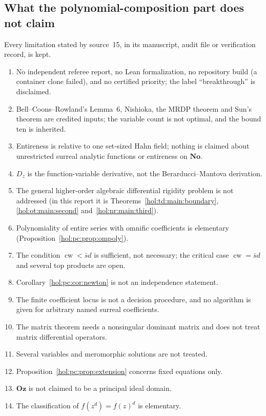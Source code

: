 \documentclass[11pt]{article}
\numberwithin{equation}{section}
\theoremstyle{definition}
\theoremstyle{remark}
\newcommand{\No}{\mathbf{No}}
\newcommand{\Oz}{\mathbf{Oz}}
\begin{document}
\subsection{What the polynomial-composition part does not claim}
\label{hol:pc:sub:nonclaims}

Every limitation stated by source~15, in its manuscript, audit file or
verification record, is kept.
\begin{enumerate}[label=\textup{(P\arabic*)}]
\item No independent referee report, no Lean formalization, no repository
build (a container clone failed), and no certified priority; the label
``breakthrough'' is disclaimed.
\item Bell--Coons--Rowland's Lemma~6, Nishioka, the MRDP theorem and Sun's
theorem are credited inputs; the variable count is not optimal, and the bound
ten is inherited.
\item Entireness is relative to one set-sized Hahn field; nothing is claimed
about unrestricted surreal analytic functions or entireness on $\No$.
\item $D_z$ is the function-variable derivative, not the Berarducci--Mantova
derivation.
\item The general higher-order algebraic differential rigidity problem is not
addressed (in this report it is Theorems~\ref{hol:td:main:boundary},
\ref{hol:ot:main:second} and~\ref{hol:nr:main:third}).
\item Polynomiality of entire series with omnific coefficients is elementary
(Proposition~\ref{hol:pc:prop:ompoly}).
\item The condition $\operatorname{cw}<\bar sd$ is sufficient, not necessary; the
critical case $\operatorname{cw}=\bar sd$ and several top products are open.
\item Corollary~\ref{hol:pc:cor:newton} is not an independence statement.
\item The finite coefficient locus is not a decision procedure, and no
algorithm is given for arbitrary named surreal coefficients.
\item The matrix theorem needs a nonsingular dominant matrix and does not treat
matrix differential operators.
\item Several variables and meromorphic solutions are not treated.
\item Proposition~\ref{hol:pc:prop:extension} concerns fixed equations only.
\item $\Oz$ is not claimed to be a principal ideal domain.
\item The classification of $f(z^d)=f(z)^d$ is elementary.

\end{enumerate}
\end{document}

